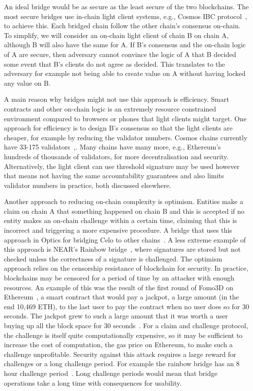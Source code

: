 \noindent An ideal bridge would be as secure as the least secure of the two blockchains. The most secure bridges use in-chain light client systems, e.g., Cosmos IBC protocol~\cite{IBC_paper}, to achieve this. Each bridged chain follow the other chain's consensus on-chain. To simplify, we will consider an on-chain light client of chain B on chain A, although B will also have the same for A. If B's consensus and the on-chain logic of A are secure, then adversary cannot convince the logic of A that B decided some event that B's clients do not agree as decided. This translates to the adversary for example not being able to create value on A without having locked any value on B.

\noindent A main reason why bridges might not use this approach is efficiency. Smart contracts and other on-chain logic is an extremely resource constrained environment compared to browsers or phones that light clients might target. One approach for efficiency is to design B's consensus so that the light clients are cheaper, for example by reducing the validator numbers. Cosmos chains currently have 33-175 validators~\cite{CosmosValNYX},\cite{CosmosValHUB}. Many chains have many more, e.g., Ethereum's hundreds of thousands of validators, for more decentralisation and security. Alternatively, the light client can use threshold signature may be used however that means not having the same accountability guarantees and also limits validator numbers in practice, both discussed elsewhere.


\noindent Another approach to reducing on-chain complexity is optimism. Entities make a claim on chain A that something happened on chain B and this is accepted if no entity makes an on-chain challenge within a certain time, claiming that this is incorrect and triggering a more expensive procedure. A bridge that uses this approach in Optics for bridging Celo to other chains~\cite{CeloOptics}. A less extreme example of this approach is NEAR's Rainbow bridge~\cite{NEARrainbowB}, where signatures are stored but not checked unless the correctness of a signature is challenged. The optimism approach relies on the censorship resistance of blockchain for security. In practice, blockchains may be censored for a period of time by an attacker with enough resources. An example of this was the result of the first round of Fomo3D on Ethereum~\cite{Fomo3DPM}, a smart contract that would pay a jackpot, a large amount (in the end 10,469 ETH), to the last user to pay the contract when no user does so for 30 seconds. The jackpot grew to such a large amount that it was worth a user buying up all the block space for 30 seconds~\cite{Fomo3DPM}. For a claim and challenge protocol, the challenge is itself quite computationally expensive, so it may be sufficient to increase the cost of computation, the gas price on Ethereum, to make such a challenge unprofitable. Security against this attack requires a large reward for challenges or a long challenge period. For example the rainbow bridge has an 8 hour challenge period~\cite{RainbowBridgeFAQ}. Long challenge periods would mean that bridge operations take a long time with consequences for usability.

